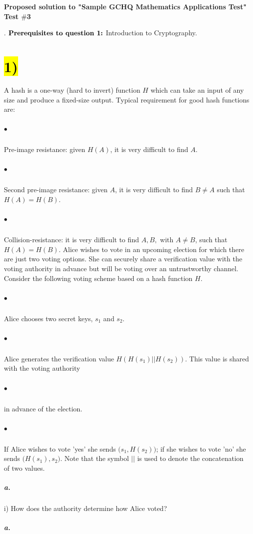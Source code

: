\documentclass[11pt]{article}
\newcommand{\pnewline}[1]{\vspace*{-\baselineskip}\subparagraph*{{\color{white} #1}}}
\newcommand{\skipnewline}{\vspace*{-\baselineskip}}
\begin{document}
{%

\begin{center}
\Large
\bf Proposed solution to "Sample GCHQ Mathematics Applications Test"\\
\vspace{2mm} Test $\#$3
\end{center}


{\color{white}.}\newline
$\text{\bf {Prerequisites to question 1:}}$ Introduction to Cryptography.
\section*{\hl{1)}} A hash is a one-way (hard to invert) function $H$ which can take an input of any size and produce a fixed-size output. Typical requirement for good hash functions are:
\subparagraph*{$\bullet$} Pre-image resistance: given $H(A)$, it is very difficult to find $A$.\skipnewline
\subparagraph*{$\bullet$} Second pre-image resistance: given $A$, it is very difficult to find $B \neq A$ such that $H(A) = H(B)$.\skipnewline
\subparagraph*{$\bullet$} Collision-resistance: it is very difficult to find $A,B,$ with $A \neq B$, such that $H(A) = H(B)$.\newline\newline
Alice wishes to vote in an upcoming election for which there are just two voting options. She can securely share a verification value with the voting authority in advance but will be voting over an untrustworthy channel.\newline\newline
Consider the following voting scheme based on a hash function $H$.
\subparagraph*{$\bullet$} Alice chooses two secret keys, $s_1$ and $s_2$.\skipnewline
\subparagraph*{$\bullet$} Alice generates the verification value $H(H(s_1)||H(s_2))$. This value is shared with the voting authority \pnewline{$\bullet$}in advance of the election.\skipnewline
\subparagraph*{$\bullet$} If Alice wishes to vote 'yes' she sends $\big(s_1, H(s_2)\big)$; if she wishes to vote 'no' she sends 
$\big(H(s_1), s_2\big)$.\newline\newline
Note that the symbol $||$ is used to denote the concatenation of two values.
\subparagraph*{a.} i) How does the authority determine how Alice voted? \pnewline{a.}
}
\end{document}
